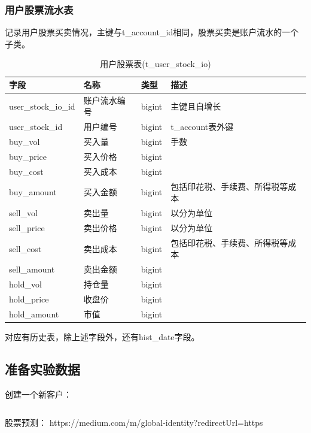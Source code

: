 \documentclass{article}
\begin{document}
\subsubsection{用户股票流水表}
记录用户股票买卖情况，主键与t\_account\_id相同，股票买卖是账户流水的一个子类。
\begin{table}[h]
    \caption{用户股票表(t\_user\_stock\_io)}
    \label{t000006}
    \begin{tabular}{|p{2cm}|p{3cm}|p{2cm}|p{5cm}|} \hline
        字段 & 名称 & 类型 & 描述 \\ \hline 
        user\_stock\_io\_id & 账户流水编号 & bigint & 主键且自增长 \\ \hline
        user\_stock\_id & 用户编号 & bigint & t\_account表外键 \\ \hline
        buy\_vol & 买入量 & bigint & 手数 \\ \hline
        buy\_price & 买入价格 & bigint & \\ \hline
        buy\_cost & 买入成本 & bigint & \\ \hline
        buy\_amount & 买入金额 & bigint & 包括印花税、手续费、所得税等成本 \\ \hline
        sell\_vol & 卖出量 & bigint & 以分为单位 \\ \hline
        sell\_price & 卖出价格 & bigint & 以分为单位  \\ \hline
        sell\_cost & 卖出成本 & bigint & 包括印花税、手续费、所得税等成本 \\ \hline
        sell\_amount & 卖出金额 & bigint & \\ \hline
        hold\_vol & 持仓量 & bigint & \\ \hline
        hold\_price & 收盘价 & bigint & \\ \hline
        hold\_amount & 市值 & bigint & \\ \hline
    \end{tabular}
\end{table}
对应有历史表，除上述字段外，还有hist\_date字段。
\subsection{准备实验数据}
创建一个新客户：
\begin{lstlisting}
\end{lstlisting}



股票预测：
https://medium.com/m/global-identity?redirectUrl=https%
\end{document}
